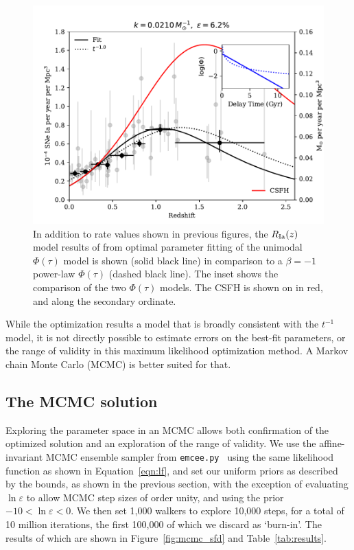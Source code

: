 \documentclass[apj]{aastex62}
\begin{document}
\begin{figure}[t] %
   \centering
   \includegraphics[width=6.5in]{figure_sfd_optimized} 
   \caption{\footnotesize In addition to rate values shown in previous figures, the $R_{\rm Ia}(z)$ model results of from optimal parameter fitting of the unimodal $\Phi(\tau)$ model is shown (solid black line) in comparison to a $\beta=-1$ power-law $\Phi(\tau)$ (dashed black line). The inset shows the comparison of the two $\Phi(\tau)$ models. The CSFH is shown on in red, and along the secondary ordinate. }
   \label{fig:sfd_optimized_curvefit}
\end{figure}

While the optimization results a model that is broadly consistent with the $t^{-1}$ model, it is not directly possible to estimate errors on the best-fit parameters, or the range of validity in this maximum likelihood optimization method. A Markov chain Monte Carlo (MCMC) is better suited for that.


\subsection{The MCMC solution\label{sec:mcmc_sfd}}
Exploring the parameter space in an MCMC allows both confirmation of the optimized solution and an exploration of the range of validity. We use the affine-invariant MCMC ensemble sampler from {\tt emcee.py}~\citep{Foreman-Mackey:2013pd} using the same likelihood function as shown in Equation~\ref{eqn:lf}, and set our uniform priors as described by the bounds, as shown in the previous section, with the exception of evaluating $\ln \varepsilon$ to allow MCMC step sizes of order unity, and using the prior $ -10 < \ln \varepsilon < 0$. We then set 1,000 walkers to explore 10,000 steps, for a total of 10 million iterations, the first 100,000 of which we discard as `burn-in'. The results of which are shown in Figure~\ref{fig:mcmc_sfd} and Table~\ref{tab:results}.
\end{document}
